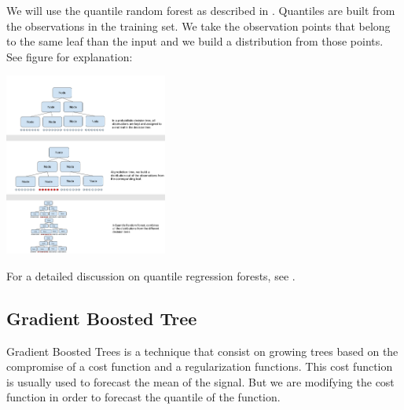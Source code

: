 \documentclass[a4paper,twocolumn,5p]{elsarticle}
\begin{document}
We will use the quantile random forest as described in \cite{randomforestdesc}. Quantiles are built 
from the observations in the training set. We take the observation points that belong to the 
same leaf than the input and we build a distribution from those points. See figure for explanation:

\includegraphics[width=0.4\textwidth]{quantile_random_forest}

For a detailed discussion on quantile regression forests, see
\cite{meinshausen_quantile_2006}.

\subsection{Gradient Boosted Tree}

Gradient Boosted Trees is a technique that consist on growing trees based on the compromise 
of a cost function and a regularization functions. This cost function is usually used to forecast 
the mean of the signal. But we are modifying the cost function 
in order to forecast the quantile of the function. 
\end{document}

